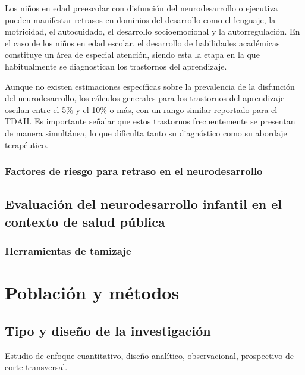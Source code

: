 \documentclass[11pt,letterpaper]{report}
\begin{document}
Los niños en edad preescolar con disfunción del neurodesarrollo o ejecutiva 
pueden manifestar retrasos en dominios del desarrollo como el lenguaje, la 
motricidad, el autocuidado, el desarrollo socioemocional y la autorregulación. 
En el caso de los niños en edad escolar, el desarrollo de habilidades
académicas constituye un área de especial atención, siendo esta la etapa en la
que  habitualmente se diagnostican los trastornos del aprendizaje.
\cite{Nelson49}

Aunque no existen estimaciones específicas sobre la prevalencia de la
disfunción del neurodesarrollo, los cálculos generales para los trastornos del
aprendizaje oscilan entre el 5\% y el 10\% o más, con un rango similar
reportado para el TDAH. Es importante señalar que estos trastornos
frecuentemente se presentan de manera simultánea, lo que dificulta tanto su
diagnóstico como su abordaje terapéutico.

\subsection{Factores de riesgo para retraso en el neurodesarrollo}


\section{Evaluación del neurodesarrollo infantil en el contexto de salud pública}

\subsection{Herramientas de tamizaje}

	\chapter{Población y métodos}
\section{Tipo y diseño de la investigación}
Estudio de enfoque cuantitativo, diseño analítico, observacional, prospectivo
de corte transversal.
\end{document}
